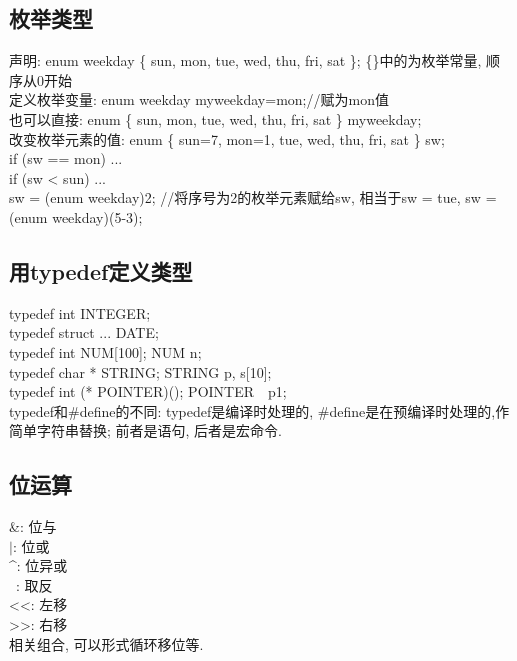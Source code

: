 \documentclass[a4paper,10pt,english]{article}
\begin{document}
\subsection {枚举类型}
声明: enum weekday \{ sun, mon, tue, wed, thu, fri, sat \}; \{\}中的为枚举常量, 顺序从0开始\\
定义枚举变量: enum weekday myweekday=mon;//赋为mon值 \\
也可以直接: enum \{ sun, mon, tue, wed, thu, fri, sat \} myweekday; \\
改变枚举元素的值: enum \{ sun=7, mon=1, tue, wed, thu, fri, sat \} sw; \\
if (sw == mon) ... \\
if (sw < sun) ... \\
sw = (enum weekday)2; //将序号为2的枚举元素赋给sw, 相当于sw = tue, sw = (enum weekday)(5-3);

\subsection {用typedef定义类型}
typedef int INTEGER; \\
typedef struct {...} DATE; \\
typedef int NUM[100]; NUM n; \\
typedef char * STRING; STRING p, s[10]; \\
typedef int (* POINTER)(); POINTER　p1; \\
typedef和\#define的不同: typedef是编译时处理的, \#define是在预编译时处理的,作简单字符串替换; 前者是语句, 后者是宏命令.

\subsection {位运算}
\&: 位与 \\
$\vert$: 位或 \\
\^{}: 位异或 \\
~: 取反 \\
<<: 左移 \\
>>: 右移 \\
相关组合, 可以形式循环移位等.
\end{document}
